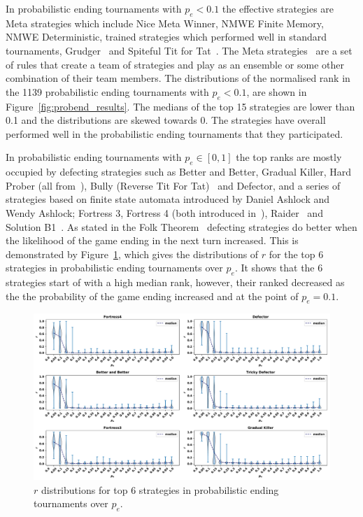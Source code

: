 \documentclass{article}
\begin{document}
In probabilistic ending tournaments with \(p_e < 0.1\) the effective strategies
are Meta strategies which include Nice Meta Winner, NMWE Finite Memory, NMWE
Deterministic, trained strategies which performed well in standard tournaments,
Grudger~\cite{axelrodproject} and Spiteful Tit for Tat~\cite{prison}. The Meta
strategies~\cite{axelrodproject} are a set of rules that create a team of
strategies and play as an ensemble or some other combination of their team
members. The distributions of the normalised rank in the 1139 probabilistic
ending tournaments with \(p_e < 0.1\), are shown in
Figure~\ref{fig:probend_results}. The medians of the top 15 strategies are lower
than 0.1 and the distributions are skewed towards 0. The strategies have overall
performed well in the probabilistic ending tournaments that they participated.

In probabilistic ending tournaments with \(p_e \in [0, 1]\) the top ranks are
mostly occupied by defecting strategies such as Better and Better, Gradual
Killer, Hard Prober (all from~\cite{axelrodproject}), Bully (Reverse Tit For
Tat)~\cite{Nachbar1992} and Defector, and a series of strategies based on finite
state automata introduced by Daniel Ashlock and Wendy Ashlock; Fortress 3,
Fortress 4 (both introduced in~\cite{Ashlock2006}), Raider~\cite{Ashlock2014}
and Solution B1~\cite{Ashlock2014}. As stated in the Folk Theorem~\cite{Fudenberg2009}
defecting strategies do better when the likelihood of the game ending in the
next turn increased. This is demonstrated by Figure~\ref{fig:effect_of_probend}, which gives the
distributions of \(r\) for the top 6 strategies in probabilistic ending tournaments
over \(p_e\). It  shows that the 6 strategies start of with a high median rank,
however, their ranked decreased as the the probability of the game ending
increased and at the point of \(p_e = 0.1\).

\begin{figure}[!htbp]
    \centering
    \includegraphics[width=\textwidth]{../images/folk_theorem.pdf}
    \caption{\(r\) distributions for top 6 strategies in probabilistic ending tournaments
    over $p_e$.}
    \label{fig:effect_of_probend}
\end{figure}
\end{document}
